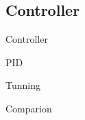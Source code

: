 \subsection{Controller}

\begin{frame}{Controller}{}

  \begin{block}{PID}

  \end{block}
  
  \begin{block}{Tunning}

  \end{block}

  \begin{block}{Comparion}

  \end{block}

\end{frame}